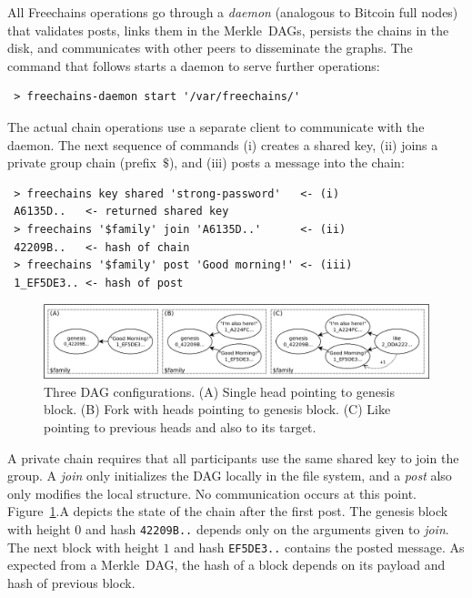 \documentclass[10pt,journal,compsoc]{IEEEtran}
\newcommand{\FC}       {Freechains\xspace}
\begin{document}
All \FC operations go through a \emph{daemon} (analogous to Bitcoin full nodes)
that validates posts, links them in the Merkle~DAGs, persists the chains in
the disk, and communicates with other peers to disseminate the graphs.
The command that follows starts a daemon to serve further operations:

{\footnotesize
\begin{verbatim}
 > freechains-daemon start '/var/freechains/'
\end{verbatim}
}

The actual chain operations use a separate client to communicate with the
daemon.
The next sequence of commands (i) creates a shared key, (ii) joins a private
group chain (prefix~$\$$), and (iii) posts a message into the chain:

{\footnotesize
\begin{verbatim}
 > freechains key shared 'strong-password'   <- (i)
 A6135D..   <- returned shared key
 > freechains '$family' join 'A6135D..'      <- (ii)
 42209B..   <- hash of chain
 > freechains '$family' post 'Good morning!' <- (iii)
 1_EF5DE3.. <- hash of post
\end{verbatim}
}

\begin{figure}
\centering
\includegraphics[width=\textwidth]{family.png}
\caption{
    Three DAG configurations.
    (A) Single head pointing to genesis block.
    (B) Fork with heads pointing to genesis block.
    (C) Like pointing to previous heads and also to its target.
}
\label{fig.family}
\end{figure}

A private chain requires that all participants use the same shared key to join
the group.
A \emph{join} only initializes the DAG locally in the file system, and a
\emph{post} also only modifies the local structure.
No communication occurs at this point.
Figure~\ref{fig.family}.A depicts the state of the chain after the first post.
The genesis block with height $0$ and hash \texttt{42209B..}
depends only on the arguments given to \emph{join}.
The next block with height $1$ and hash \texttt{EF5DE3..} contains the posted
message.
As expected from a Merkle~DAG, the hash of a block depends on its payload and
hash of previous block.
\end{document}

